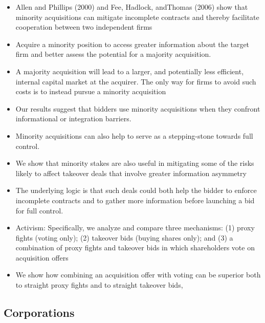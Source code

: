 \documentclass[12pt]{article}
\begin{document}
\begin{itemize}
    \item Allen and Phillips (2000) and Fee, Hadlock, andThomas (2006) show that minority acquisitions can mitigate incomplete contracts and thereby facilitate cooperation between two independent firms \citep{Ouimet2013}

    \item Acquire a minority position to access greater information about the target firm and better assess the potential for a majority acquisition. \citep{Ouimet2013}

    \item A majority acquisition will lead to a larger, and potentially less efficient, internal capital market at the acquirer. The only way for firms to avoid such costs is to instead pursue a minority acquisition \citep{Ouimet2013}

    \item Our results suggest that bidders use minority acquisitions when they confront informational or integration barriers. \citep{huang}

    \item Minority acquisitions can also help to serve as a stepping-stone towards full control. \citep{huang}

    \item We show that minority stakes are also useful in mitigating some of the risks likely to affect takeover deals that involve greater information asymmetry \citep{huang}

    \item The underlying logic is that such deals could both help the bidder to enforce incomplete contracts and to gather more information before launching a bid for full control. \citep{huang}

    \item Activism: Specifically, we analyze and compare three mechanisms: (1) proxy fights (voting only); (2) takeover bids (buying shares only); and (3) a combination of proxy fights and takeover bids in which shareholders vote on acquisition offers \citep{Arlen2001}

    \item We show how combining an acquisition offer with voting can be superior both to straight proxy fights and to straight takeover bids, \citep{Arlen2001}
\end{itemize}
\subsection{Corporations}
\end{document}
